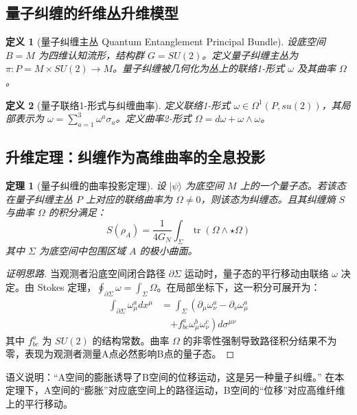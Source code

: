 \documentclass[11pt,a4paper]{article}
\newtheorem{theorem}{定理}
\newtheorem{definition}{定义}
\begin{document}
\subsection{量子纠缠的纤维丛升维模型}
\begin{definition}[量子纠缠主丛 Quantum Entanglement Principal Bundle]
设底空间 \(B=M\) 为四维认知流形，结构群 \(G=SU(2)\)。定义量子纠缠主丛为 \(\pi:P=M\times SU(2)\to M\)。量子纠缠被几何化为丛上的联络1-形式 \(\omega\) 及其曲率 \(\Omega\)。
\end{definition}

\begin{definition}[量子联络1-形式与纠缠曲率]
定义联络1-形式 \(\omega\in\Omega^1(P,su(2))\)，其局部表示为 \(\omega=\sum_{a=1}^3 \omega^a \sigma_a\)。定义曲率2-形式 \(\Omega=d\omega+\omega\wedge\omega\)。
\end{definition}

\subsection{升维定理：纠缠作为高维曲率的全息投影}
\begin{theorem}[量子纠缠的曲率投影定理]
设 \(|\psi\rangle\) 为底空间 \(M\) 上的一个量子态。若该态在量子纠缠主丛 \(P\) 上对应的联络曲率为 \(\Omega\neq 0\)，则该态为纠缠态。且其纠缠熵 \(S\) 与曲率 \(\Omega\) 的积分满足：
\[
S(\rho_A)=\frac{1}{4G_N}\int_\Sigma \operatorname{tr}(\Omega\wedge\star\Omega)
\]
其中 \(\Sigma\) 为底空间中包围区域 \(A\) 的极小曲面。
\end{theorem}

\begin{proof}[证明思路]
当观测者沿底空间闭合路径 \(\partial\Sigma\) 运动时，量子态的平行移动由联络 \(\omega\) 决定。由 Stokes 定理，\(\oint_{\partial\Sigma}\omega=\int_\Sigma \Omega\)。在局部坐标下，这一积分可展开为：
\begin{align*}
\int_{\partial\Sigma} \omega^a_\mu dx^\mu 
&= \int_\Sigma \left( \partial_\mu \omega^a_\nu - \partial_\nu \omega^a_\mu \right. \\
&\quad \left. + f^a_{bc} \omega^b_\mu \omega^c_\nu \right) d\sigma^{\mu\nu}
\end{align*}
其中 \(f^a_{bc}\) 为 \(SU(2)\) 的结构常数。曲率 \(\Omega\) 的非零性强制导致路径积分结果不为零，表现为观测者测量A点必然影响B点的量子态。
\end{proof}

语义说明：“A空间的膨胀诱导了B空间的位移运动，这是另一种量子纠缠。” 在本定理下，A空间的“膨胀”对应底空间上的路径运动，B空间的“位移”对应高维纤维上的平行移动。
\end{document}
